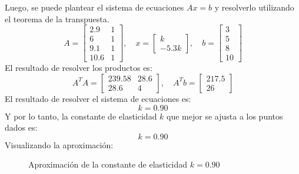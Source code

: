 \documentclass{article}
\begin{document}
Luego, se puede plantear el sistema de ecuaciones \( Ax = b \) y resolverlo utilizando el teorema de la transpuesta.
\begin{equation}
    A = \begin{bmatrix}
        2.9 & 1 \\
        6 & 1 \\
        9.1 & 1 \\
        10.6 & 1
    \end{bmatrix}, \quad x = \begin{bmatrix}
        k \\
        -5.3k
    \end{bmatrix}, \quad b = \begin{bmatrix}
        3 \\
        5 \\
        8 \\
        10
    \end{bmatrix}
\end{equation}
El resultado de resolver los productos es:
\begin{equation}
    A^TA = \begin{bmatrix}
        239.58 & 28.6 \\
        28.6 & 4
    \end{bmatrix}, \quad A^Tb = \begin{bmatrix}
        217.5 \\
        26
    \end{bmatrix}
\end{equation}
El resultado de resolver el sistema de ecuaciones es:
\begin{equation}
    k = 0.90
\end{equation}
Y por lo tanto, la constante de elasticidad \( k \) que mejor se ajusta a los puntos dados es:
\begin{equation}
    k = 0.90
\end{equation}
Visualizando la aproximación:
\begin{figure}[h]
    \centering
    \caption{Aproximación de la constante de elasticidad \( k = 0.90 \)}
    \label{fig:myplot7}
\end{figure}
\end{document}
